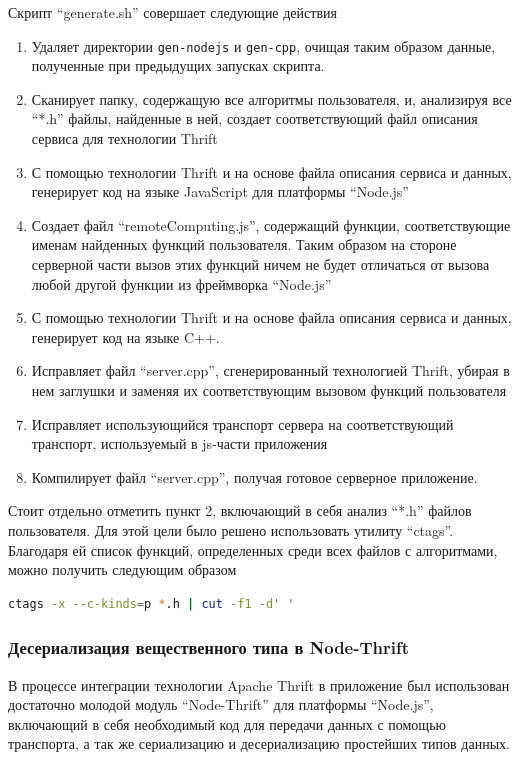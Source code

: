\documentclass[12pt, a4paper]{article}
\begin{document}
Скрипт ``generate.sh'' совершает следующие действия
\begin{enumerate}
    \item Удаляет директории \texttt{gen-nodejs} и \texttt{gen-cpp}, очищая
    таким образом данные, полученные при предыдущих запусках скрипта.
    \item Сканирует папку, содержащую все алгоритмы пользователя, и, анализируя
    все ``*.h'' файлы, найденные в ней, создает соответствующий файл описания
    сервиса для технологии Thrift
    \item С помощью технологии Thrift и на основе файла описания сервиса и
    данных, генерирует код на языке JavaScript для платформы ``Node.js''
    \item Создает файл ``remoteComputing.js'', содержащий функции,
    соответствующие именам найденных функций пользователя. Таким образом на
    стороне серверной части вызов этих функций ничем не будет отличаться
    от вызова любой другой функции из фреймворка ``Node.js''
    \item С помощью технологии Thrift и на основе файла описания сервиса и
    данных, генерирует код на языке C++.
    \item Исправляет файл ``server.cpp'', сгенерированный технологией Thrift,
    убирая в нем заглушки и заменяя их соответствующим вызовом функций
    пользователя
    \item Исправляет использующийся транспорт сервера на соответствующий
    транспорт, используемый в js-части приложения
    \item Компилирует файл ``server.cpp'', получая готовое серверное приложение.
\end{enumerate}

Стоит отдельно отметить пункт 2, включающий в себя анализ ``*.h'' файлов
пользователя. Для этой цели было решено использовать утилиту ``ctags''.
Благодаря ей список функций, определенных среди всех файлов с алгоритмами, можно
получить следующим образом
\begin{lstlisting}[language=bash]
    ctags -x --c-kinds=p *.h | cut -f1 -d' '
\end{lstlisting}

\subsubsection{Десериализация вещественного типа в Node-Thrift}

В процессе интеграции технологии Apache Thrift в приложение был использован
достаточно молодой модуль ``Node-Thrift'' для платформы ``Node.js'', включающий
в себя
необходимый код для передачи данных с помощью транспорта, а так же сериализацию
и десериализацию простейших типов данных.
\end{document}

